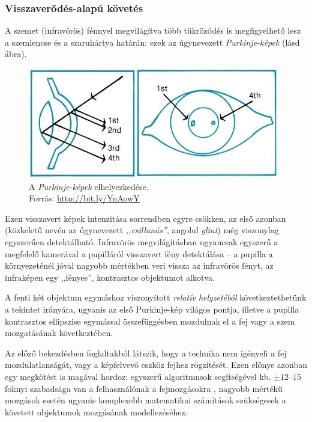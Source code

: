 \subsubsection{Visszaverődés-alapú követés}\label{sect:visszaverodes}

A szemet (infravörös) fénnyel megvilágítva több tükröződés is megfigyelhető lesz a szemlencse és a szaruhártya határán: ezek az úgynevezett \emph{Purkinje-képek} (lásd  ábra).

\begin{figure}[!ht]
\centering
\includegraphics[width=110mm, keepaspectratio]{figures/purkinje_kepek.png}
\caption{A \emph{Purkinje-képek} elhelyezkedése.\\Forrás: \url{http://bit.ly/YnAowY}}
\label{fig:purkinje}
\end{figure}

Ezen visszavert képek intenzitása sorrendben egyre csökken, az első azonban (közkeletű nevén az úgynevezett \emph{,,csillanás''}, angolul \emph{glint}) még viszonylag egyszerűen detektálható. Infravörös megvilágításban ugyancsak egyszerű a megfelelő kamerával a pupilláról visszavert fény detektálása -- a pupilla a környezeténél jóval nagyobb mértékben veri vissza az infravörös fényt, az infraképen egy ,,fényes'', kontrasztos objektumot alkotva.

A fenti két objektum egymáshoz viszonyított \emph{relatív helyzetéből} következtethetünk a tekintet irányára, ugyanis az első Purkinje-kép világos pontja, illetve a pupilla kontrasztos ellipszise egymással összefüggésben mozdulnak el a fej vagy a szem mozgatásának következtében.

Az előző bekezdésben foglaltakból látszik, hogy a technika nem igényeli a fej mozdulatlanságát, vagy a képfelvevő eszköz fejhez rögzítését. Ezen előnye azonban egy megkötést is magával hordoz: egyszerű algoritmusok segítségével kb. $\pm12$--$15$ foknyi szabadsága van a felhasználónak a fejmozgásokra \cite{scott}, nagyobb mértékű mozgások esetén ugyanis komplexebb matematikai számítások szükségesek a követett objektumok mozgásának modellezéséhez.

